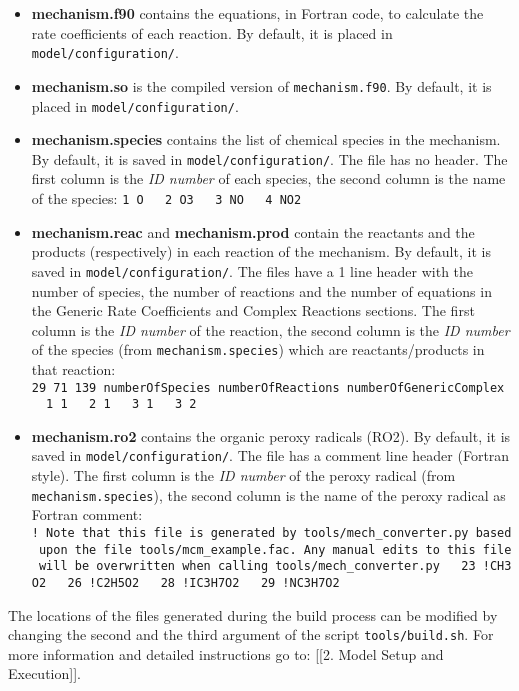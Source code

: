 \begin{itemize}
\item
  \textbf{mechanism.f90} contains the equations, in Fortran code, to
  calculate the rate coefficients of each reaction. By default, it is
  placed in \texttt{model/configuration/}.
\item
  \textbf{mechanism.so} is the compiled version of
  \texttt{mechanism.f90}. By default, it is placed in
  \texttt{model/configuration/}.
\item
  \textbf{mechanism.species} contains the list of chemical species in
  the mechanism. By default, it is saved in
  \texttt{model/configuration/}. The file has no header. The first
  column is the \emph{ID number} of each species, the second column is
  the name of the species:
  \texttt{1\ O\ \ \ 2\ O3\ \ \ 3\ NO\ \ \ 4\ NO2}
\item
  \textbf{mechanism.reac} and \textbf{mechanism.prod} contain the
  reactants and the products (respectively) in each reaction of the
  mechanism. By default, it is saved in \texttt{model/configuration/}.
  The files have a 1 line header with the number of species, the number
  of reactions and the number of equations in the Generic Rate
  Coefficients and Complex Reactions sections. The first column is the
  \emph{ID number} of the reaction, the second column is the \emph{ID
  number} of the species (from \texttt{mechanism.species}) which are
  reactants/products in that reaction:
  \texttt{29\ 71\ 139\ numberOfSpecies\ numberOfReactions\ numberOfGenericComplex\ \ \ 1\ 1\ \ \ 2\ 1\ \ \ 3\ 1\ \ \ 3\ 2}
\item
  \textbf{mechanism.ro2} contains the organic peroxy radicals (RO2). By
  default, it is saved in \texttt{model/configuration/}. The file has a
  comment line header (Fortran style). The first column is the \emph{ID
  number} of the peroxy radical (from \texttt{mechanism.species}), the
  second column is the name of the peroxy radical as Fortran comment:
  \texttt{!\ Note\ that\ this\ file\ is\ generated\ by\ tools/mech\_converter.py\ based\ upon\ the\ file\ tools/mcm\_example.fac.\ Any\ manual\ edits\ to\ this\ file\ will\ be\ overwritten\ when\ calling\ tools/mech\_converter.py\ \ \ 23\ !CH3O2\ \ \ 26\ !C2H5O2\ \ \ 28\ !IC3H7O2\ \ \ 29\ !NC3H7O2}
\end{itemize}

The locations of the files generated during the build process can be
modified by changing the second and the third argument of the script
\texttt{tools/build.sh}. For more information and detailed instructions
go to: {[}{[}2. Model Setup and Execution{]}{]}.

